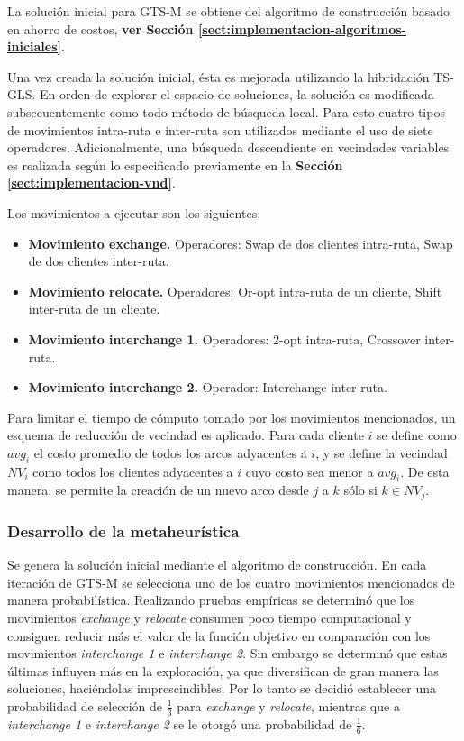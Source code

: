 La solución inicial para GTS-M se obtiene del algoritmo de construcción basado en ahorro de costos, \textbf{ver Sección \ref{sect:implementacion-algoritmos-iniciales}}. 

Una vez creada la solución inicial, ésta es mejorada utilizando la hibridación TS-GLS. En orden de explorar el espacio de soluciones, la solución es modificada subsecuentemente como todo método de búsqueda local. Para esto cuatro tipos de movimientos intra-ruta e inter-ruta son utilizados mediante el uso de siete operadores. Adi\-cio\-nal\-men\-te, una búsqueda descendiente en vecindades variables es realizada  según lo especificado previamente en la \textbf{Sección \ref{sect:implementacion-vnd}}.

Los movimientos a ejecutar son los siguientes:

\begin{itemize}
\item \textbf{Movimiento exchange.} Operadores: Swap de dos clientes intra-ruta, Swap de dos clientes inter-ruta.
\item \textbf{Movimiento relocate.} Operadores: Or-opt intra-ruta de un cliente, Shift inter-ruta de un cliente.
\item \textbf{Movimiento interchange 1.} Operadores: 2-opt intra-ruta, Crossover inter-ruta.
\item \textbf{Movimiento interchange 2.} Operador: Interchange inter-ruta.
\end{itemize}

Para limitar el tiempo de cómputo tomado por los movimientos mencionados, un esquema de reducción de vecindad es aplicado. Para cada cliente $i$ se define como $avg_i$ el costo promedio de todos los arcos adyacentes a $i$, y se define la vecindad $NV_i$ como todos los clientes adyacentes a $i$ cuyo costo sea menor a $avg_i$. De esta manera, se permite la creación de un nuevo arco desde $j$ a $k$ sólo si $k \in NV_j$.\\


\subsubsection*{Desarrollo de la metaheurística}

Se genera la solución inicial mediante el algoritmo de construcción. En cada iteración de GTS-M se selecciona uno de los cuatro movimientos mencionados de manera probabilística. Realizando pruebas empíricas se determinó que los movimientos \emph{exchange} y \emph{relocate} consumen poco tiempo computacional y consiguen reducir más el valor de la función objetivo en comparación con los movimientos \emph{interchange 1} e \emph{interchange 2}. Sin embargo se determinó que estas últimas influyen más en la exploración, ya que diversifican de gran manera las soluciones, haciéndolas imprescindibles. Por lo tanto se decidió establecer una probabilidad de selección de $\frac{1}{3}$ para \emph{exchange} y \emph{relocate}, mientras que a \emph{interchange 1} e \emph{interchange 2} se le otorgó una probabilidad de $\frac{1}{6}$.


